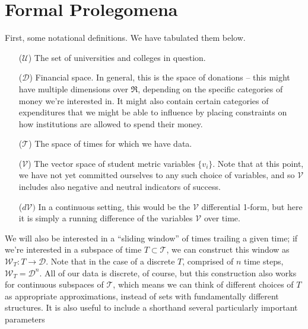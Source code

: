 \documentclass[paper.tex]{subfiles}
\newcommand{\U}{\mathcal{U}}
\newcommand{\D}{\mathcal{D}}
\newcommand{\V}{\mathcal{V}}
\newcommand{\T}{\mathcal{T}}
\newcommand{\W}{\mathcal{W}}
\begin{document}
	
	\section{Formal Prolegomena}
	
	First, some notational definitions. We have tabulated them below. 
	
	
	\begin{itemize}
		\item[($\U$)] The set of universities and colleges in question.
		\item[($\D$)] Financial space. In general, this is the space of donations -- this might have multiple dimensions over $\Re$, depending on the specific categories of money we're interested in. It might also contain certain categories of expenditures that we might be able to influence by placing constraints on how institutions are allowed to spend their money.  
		\item[($\T$)] The space of times for which we have data. 
		\item[($\V$)] The vector space of student metric variables $\{v_i\}$. Note that at this point, we have not yet committed ourselves to any such choice of variables, and so $\V$ includes also negative and neutral indicators of success.
		\item[($d\V)$] In a continuous setting, this would be the $\V$ differential 1-form, but here it is simply a running difference of the variables $\V$ over time.  
	\end{itemize}
			
	We will also be interested in a ``sliding window'' of times trailing a given time; if we're interested in a subspace of time $T \subset \T$, we can construct this window as $\W_T : T  \to \D$. Note that in the case of a discrete $T$, comprised of $n$ time steps, $\W_T = \D^n$. All of our data is discrete, of course, but this construction also works for continuous subspaces of $\T$, which means we can think of different choices of $T$ as appropriate approximations, instead of sets with fundamentally different structures. It is also useful to include a shorthand several particularly important parameters
	
\end{document}
